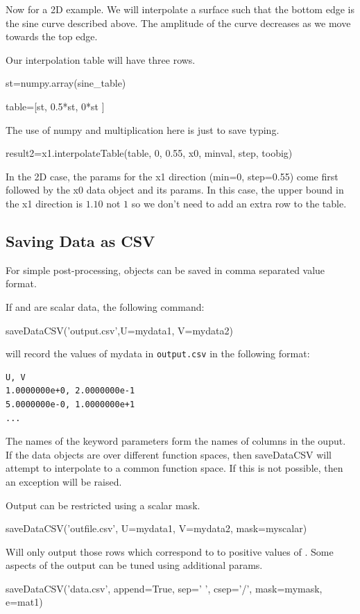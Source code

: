 Now for a 2D example.
We will interpolate a surface such that the bottom edge is the sine curve described above.
The amplitude of the curve decreases as we move towards the top edge.

Our interpolation table will have three rows.
\begin{python}
st=numpy.array(sine_table)

table=[st, 0.5*st, 0*st ]
\end{python}

The use of numpy and multiplication here is just to save typing.

\begin{python}
result2=x1.interpolateTable(table, 0, 0.55, x0, minval, step, toobig)
\end{python}

In the 2D case, the params for the x1 direction (min=0, step=0.55) come first followed by the x0 data object and 
its params.
In this case, the upper bound in the x1 direction is $1.10$ not $1$ so we don't need to add an extra row to the table.

\subsection{Saving Data as CSV}
For simple post-processing, \Data objects can be saved in comma separated value format.

If  and  are scalar data, the following command:
\begin{python}
saveDataCSV('output.csv',U=mydata1, V=mydata2)
\end{python}
will record the values of mydata in \texttt{output.csv} in the following format:
\begin{verbatim}
U, V
1.0000000e+0, 2.0000000e-1
5.0000000e-0, 1.0000000e+1
...
\end{verbatim}

The names of the keyword parameters form the names of columns in the ouput.
If the data objects are over different function spaces, then saveDataCSV will attempt to
interpolate to a common function space.
If this is not possible, then an exception will be raised.

Output can be restricted using a scalar mask.
\begin{python}
saveDataCSV('outfile.csv', U=mydata1, V=mydata2, mask=myscalar)
\end{python}
Will only output those rows which correspond to to positive values of .
Some aspects of the output can be tuned using additional params.
\begin{python}
saveDataCSV('data.csv', append=True, sep=' ', csep='/', mask=mymask, e=mat1)
\end{python}

